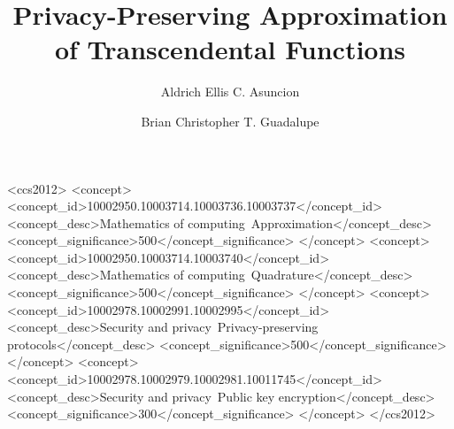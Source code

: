 \documentclass[sigconf,balance]{acmart}
\begin{document}
\title{Privacy-Preserving Approximation of Transcendental Functions}

\author{Aldrich Ellis C. Asuncion}

\author{Brian Christopher T. Guadalupe}

\renewcommand{\shortauthors}{Aldrich Asuncion and Brian Guadalupe}

\begin{abstract}

\end{abstract}

%
%
\begin{CCSXML}
    <ccs2012>
    <concept>
    <concept_id>10002950.10003714.10003736.10003737</concept_id>
    <concept_desc>Mathematics of computing~Approximation</concept_desc>
    <concept_significance>500</concept_significance>
    </concept>
    <concept>
    <concept_id>10002950.10003714.10003740</concept_id>
    <concept_desc>Mathematics of computing~Quadrature</concept_desc>
    <concept_significance>500</concept_significance>
    </concept>
    <concept>
    <concept_id>10002978.10002991.10002995</concept_id>
    <concept_desc>Security and privacy~Privacy-preserving protocols</concept_desc>
    <concept_significance>500</concept_significance>
    </concept>
    <concept>
    <concept_id>10002978.10002979.10002981.10011745</concept_id>
    <concept_desc>Security and privacy~Public key encryption</concept_desc>
    <concept_significance>300</concept_significance>
    </concept>
    </ccs2012>
\end{CCSXML}

\end{document}
